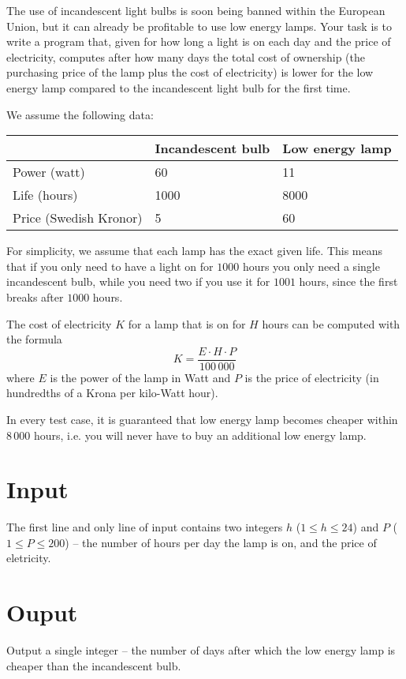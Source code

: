 The use of incandescent light bulbs is soon being banned within the European Union, but it can already be profitable to use low energy lamps.
Your task is to write a program that, given for how long a light is on each day and the price of electricity, computes after how many days the total cost of ownership (the purchasing price of the lamp plus the cost of electricity) is lower for the low energy lamp compared to the incandescent light bulb for the first time.

We assume the following data:

\noindent
\begin{tabular}{|l|l|l|}
\hline
& Incandescent bulb & Low energy lamp \\ \hline
Power (watt)           & 60                & 11             \\ \hline
Life (hours)           & 1000              & 8000           \\ \hline
Price (Swedish Kronor) & 5                 & 60             \\ \hline
\end{tabular}

For simplicity, we assume that each lamp has the exact given life.
This means that if you only need to have a light on for $1000$ hours you only need a single incandescent bulb, while you need two if you use it for $1001$ hours, since the first breaks after $1000$ hours.

The cost of electricity $K$ for a lamp that is on for $H$ hours can be computed with the formula
$$ K = \frac{E \cdot H \cdot P}{100\,000} $$
where $E$ is the power of the lamp in Watt and $P$ is the price of electricity (in hundredths of a Krona per kilo-Watt hour).

In every test case, it is guaranteed that low energy lamp becomes cheaper within $8\,000$ hours, i.e. you will never have to buy an additional low energy lamp.

\section*{Input}
The first line and only line of input contains two integers $h$ ($1 \le h \le 24$) and $P$ ($1 \le P \le 200$) -- the number of hours per day the lamp is on, and the price of eletricity.

\section*{Ouput}
Output a single integer -- the number of days after which the low energy lamp is cheaper than the incandescent bulb.

